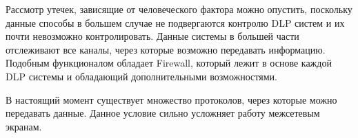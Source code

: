 Рассмотр утечек, зависящие от человеческого фактора можно опустить, поскольку данные способы в большем случае не подвергаются контролю DLP систем и их почти невозможно контролировать. Данные системы в большей части отслеживают все каналы, через которые возможно передавать информацию. Подобным функционалом обладает Firewall, который лежит в основе каждой DLP системы и обладающий дополнительными возможностями.

В настоящий момент существует множество протоколов, через которые можно передавать данные. Данное условие сильно усложняет работу межсетевым экранам.



